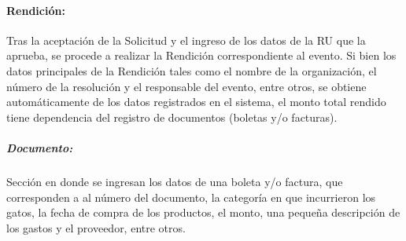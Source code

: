 \paragraph{Rendición: } Tras la aceptación de la Solicitud y el ingreso de los datos de la RU que la aprueba, se procede a realizar la Rendición correspondiente al evento. Si bien los datos principales de la Rendición tales como el nombre de la organización, el número de la resolución y el responsable del evento, entre otros, se obtiene automáticamente de los datos registrados en el sistema, el monto total rendido tiene dependencia del registro de documentos (boletas y/o facturas).

    \subparagraph{\emph{Documento: }} Sección en donde se ingresan los datos de una boleta y/o factura, que corresponden a al número del documento, la categoría en que incurrieron los gatos, la fecha de compra de los productos, el monto, una pequeña descripción de los gastos y el proveedor, entre otros.




